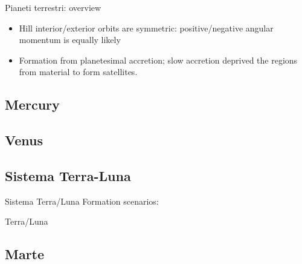 \begin{wordonframe}{Pianeti terrestri: overview}
\begin{itemize}\item Hill interior/exterior orbits are symmetric: positive/negative angular momentum is equally likely
\item Formation from planetesimal accretion; slow accretion deprived the regions from material to form satellites.

\end{itemize}
\end{wordonframe}

\subsection{Mercury}


\subsection{Venus}


\subsection{Sistema Terra-Luna}

\begin{frame}{Sistema Terra/Luna}
Formation scenarios:
\end{frame}

\begin{wordonframe}{Terra/Luna}

\end{wordonframe}

\subsection{Marte}

